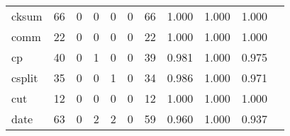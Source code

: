 \begin{longtable}{lp{1.20cm}p{1.20cm}p{1.20cm}p{1.20cm}p{1.20cm}p{1.20cm}p{1.20cm}p{1.20cm}p{1.20cm}p{1.20cm}}
cksum     &                                    66 &                                                  0 &                                                  0 &                                                  0 &                                                  0 &                                                 66 &                                         1.000 &                                              1.000 &                                              1.000 \\
comm      &                                    22 &                                                  0 &                                                  0 &                                                  0 &                                                  0 &                                                 22 &                                         1.000 &                                              1.000 &                                              1.000 \\
cp        &                                    40 &                                                  0 &                                                  1 &                                                  0 &                                                  0 &                                                 39 &                                         0.981 &                                              1.000 &                                              0.975 \\
csplit    &                                    35 &                                                  0 &                                                  0 &                                                  1 &                                                  0 &                                                 34 &                                         0.986 &                                              1.000 &                                              0.971 \\
cut       &                                    12 &                                                  0 &                                                  0 &                                                  0 &                                                  0 &                                                 12 &                                         1.000 &                                              1.000 &                                              1.000 \\
date      &                                    63 &                                                  0 &                                                  2 &                                                  2 &                                                  0 &                                                 59 &                                         0.960 &                                              1.000 &                                              0.937 \\

\end{longtable}
